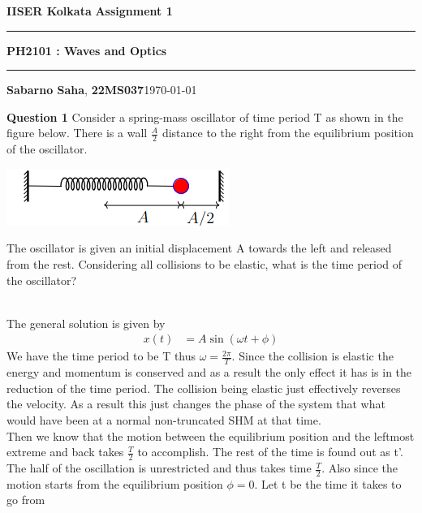 \documentclass[addpoints]{exam}
\begin{document}
\par\textbf{IISER Kolkata} \hfill \textbf{Assignment 1}
\vspace{3pt}
\hrule
\vspace{3pt}
\begin{center}
        \LARGE{\textbf{PH2101 : Waves and Optics}}
\end{center}
\vspace{3pt}

\hrule
\vspace{4pt}
\textbf{Sabarno Saha}, \textbf{22MS037}\hfill \today

\vspace{20pt}

\bigskip

\begin{questions}

\question \textbf{ Question 1}
Consider a spring-mass oscillator of time period T as shown in the figure below. There is a wall $\frac{A}{2}$ distance to the right from the equilibrium position of the oscillator.
\begin{center}
    \includegraphics{q1.png}
\end{center}
The oscillator is given an initial displacement A towards the left and released from the rest.
Considering all collisions to be elastic, what is the time period of the oscillator?
\begin{solution}\\
 The general solution is given by 
 \begin{align*}
     x(t) &= A \sin(\omega t+ \phi) 
 \end{align*}
 We have the time period to be T thus $\omega = \frac{2\pi}{T}$. Since the collision is elastic the energy and momentum is conserved and as a result the only effect it has is 
 in the reduction of the time period. The collision being elastic just effectively reverses the velocity. As a result this just changes the phase of the system that what would 
 have been at a normal non-truncated SHM at that time.\\
 Then we know that the motion between the equilibrium position and the leftmost extreme and back takes $\frac{T}{2}$ to accomplish. The rest of the time is found out as t'.\\
 The half of the oscillation is unrestricted and thus takes time $\frac{T}{2}$. Also since the motion starts from the equilibrium position $\phi =0$. Let t be the time it takes to go from 

\end{solution}
\end{questions}
\end{document}

